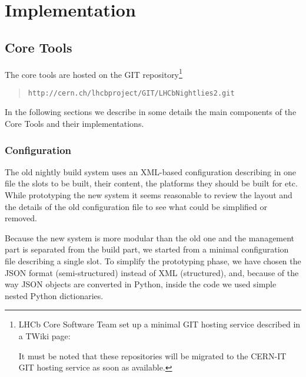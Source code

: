 \section{Implementation}
\label{sec:Implementation}
\subsection{Core Tools}
\label{sec:CoreTools}
The core tools are hosted on the GIT repository\footnote{%
  LHCb Core Software Team set up a minimal GIT hosting service described in a
TWiki page:
  \begin{quote}
  \end{quote}
  It must be noted that these repositories will be migrated to the CERN-IT GIT
  hosting service as soon as available.}
\begin{quote}
  \texttt{http://cern.ch/lhcbproject/GIT/LHCbNightlies2.git}
\end{quote}

In the following sections we describe in some details the main components of the
Core Tools and their implementations.

\subsubsection{Configuration}
The old nightly build system uses an XML-based configuration describing in one
file the slots to be built, their content, the platforms they should be built
for etc.  While prototyping the new system it seems reasonable to review the
layout and the details of the old configuration file to see what could be
simplified or removed.

Because the new system is more modular than the old one and the management part
is separated from the build part, we started from a minimal configuration file
describing a single slot.  To simplify the prototyping phase, we have chosen the
JSON format (semi-structured) instead of XML (structured), and, because of the
way JSON objects are converted in Python, inside the code we used simple nested
Python dictionaries.

